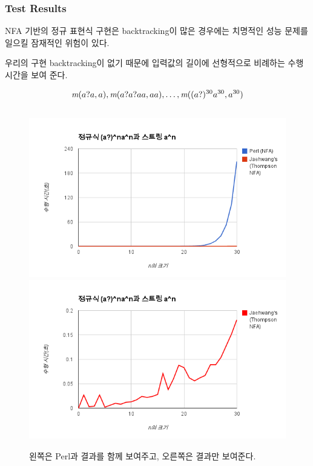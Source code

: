 \begin{frame}
    \frametitle{Test Results}

NFA 기반의 정규 표현식 구현은 backtracking이 많은 경우에는 치명적인
성능 문제를 일으킬 잠재적인 위험이 있다.

우리의 구현  backtracking이 없기 때문에 입력값의 길이에 선형적으로
비례하는 수행 시간을 보여 준다.

\[
    \rmatch{a}{a?a},  \rmatch{aa}{a?a?aa}, \dots,
    \rmatch{a^{30}}{(a?)^{30}a^{30}}
\]

\begin{figure}
\begin{columns}[b]
    \column{.5\paperwidth}
        \includegraphics[width=.5\paperwidth]{result-compare.png}
    \column{.5\paperwidth}
        \includegraphics[width=.5\paperwidth]{result-single.png}
\end{columns}
\caption{왼쪽은 Perl과  결과를 함께 보여주고, 오른쪽은 
    결과만 보여준다.}
\end{figure}
 
\end{frame}

